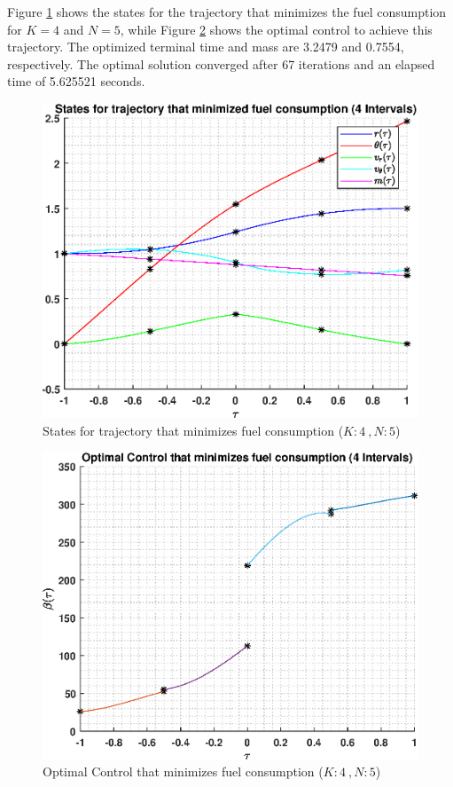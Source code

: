 \documentclass[]{article}
\begin{document}
Figure \ref{fig:directStatesK4Poly5} shows the states for the trajectory that minimizes the fuel consumption for \(K = 4\) and  \(N = 5\), while Figure \ref{fig:directControlK4Poly5} shows the optimal control to achieve this trajectory. The optimized terminal time and mass are 3.2479 and 0.7554, respectively. The optimal solution converged after 67 iterations and an elapsed time of 5.625521 seconds.
\begin{figure}
	\centering
	\includegraphics[scale=0.75]{directStatesK4Poly5.eps}
	\caption{States for trajectory that minimizes fuel consumption (\(K:4\ , N:5\))}
	\label{fig:directStatesK4Poly5}
\end{figure}
\begin{figure}
	\centering
	\includegraphics[scale=0.75]{directControlK4Poly5.eps}
	\caption{Optimal Control that minimizes fuel consumption (\(K:4\ , N:5\))}
	\label{fig:directControlK4Poly5}
\end{figure}
\FloatBarrier
\end{document}
